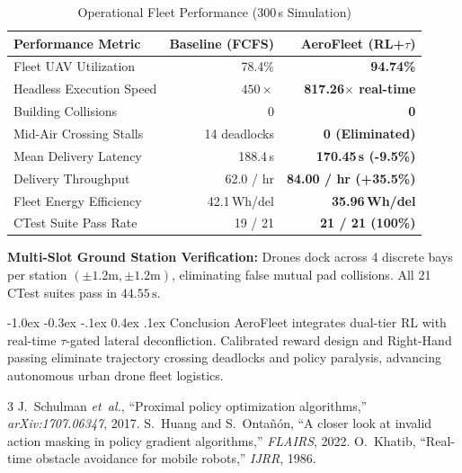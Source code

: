 \documentclass[10pt,twocolumn,letterpaper]{article}
\makeatletter
\renewcommand{\section}{\@startsection{section}{1}{\z@}%
  {-1.0ex \@plus -0.3ex \@minus -.1ex}%
  {0.4ex \@plus .1ex}%
  {\normalfont\bfseries\normalsize}}
\makeatother
\begin{document}
\begin{table}[h]
\centering
\footnotesize
\setlength{\tabcolsep}{3.5pt}
\caption{Operational Fleet Performance (300\,s Simulation)}
\label{tab:metrics}
\begin{tabularx}{\columnwidth}{lrr}
\toprule
\textbf{Performance Metric} & \textbf{Baseline (FCFS)} & \textbf{AeroFleet (RL+$\tau$)} \\
\midrule
Fleet UAV Utilization & 78.4\% & \textbf{94.74\%} \\
Headless Execution Speed & $450\times$ & \textbf{817.26$\times$ real-time} \\
Building Collisions & 0 & \textbf{0} \\
Mid-Air Crossing Stalls & 14 deadlocks & \textbf{0 (Eliminated)} \\
Mean Delivery Latency & 188.4\,s & \textbf{170.45\,s (-9.5\%)} \\
Delivery Throughput & 62.0 / hr & \textbf{84.00 / hr (+35.5\%)} \\
Fleet Energy Efficiency & 42.1\,Wh/del & \textbf{35.96\,Wh/del} \\
CTest Suite Pass Rate & 19 / 21 & \textbf{21 / 21 (100\%)} \\
\bottomrule
\end{tabularx}
\vspace{-0.15cm}
\end{table}

\textbf{Multi-Slot Ground Station Verification:} Drones dock across 4 discrete bays per station $(\pm 1.2\text{m}, \pm 1.2\text{m})$, eliminating false mutual pad collisions. All 21 CTest suites pass in $44.55\,\text{s}$.

\section{Conclusion}
AeroFleet integrates dual-tier RL with real-time $\tau$-gated lateral deconfliction. Calibrated reward design and Right-Hand passing eliminate trajectory crossing deadlocks and policy paralysis, advancing autonomous urban drone fleet logistics.

\vspace{-0.15cm}
\begin{thebibliography}{3}
\scriptsize
\setlength{\itemsep}{0pt}
 J.~Schulman \emph{et~al.}, ``Proximal policy optimization algorithms,'' \emph{arXiv:1707.06347}, 2017.
 S.~Huang and S.~Onta{\~n}{\'o}n, ``A closer look at invalid action masking in policy gradient algorithms,'' \emph{FLAIRS}, 2022.
 O.~Khatib, ``Real-time obstacle avoidance for mobile robots,'' \emph{IJRR}, 1986.
\end{thebibliography}
\end{document}
